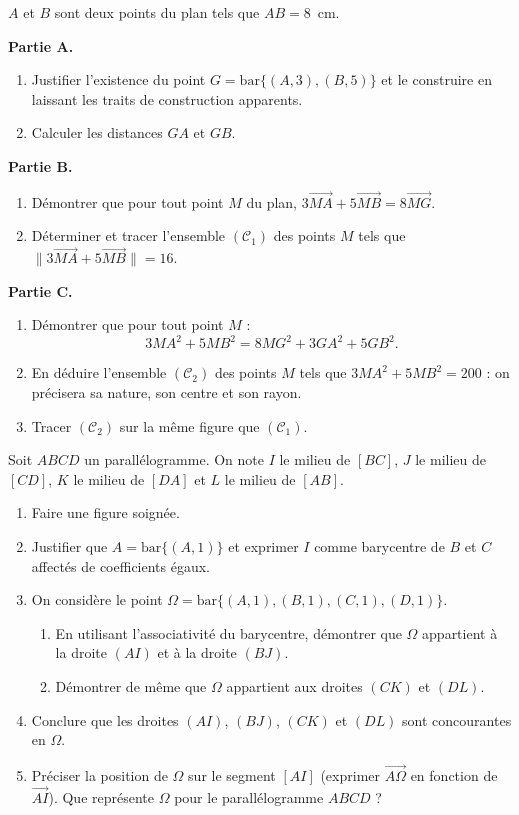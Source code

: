 \documentclass[11pt]{article}
\begin{document}
\begin{exercice}
$A$ et $B$ sont deux points du plan tels que $AB=8$~cm.

\textbf{Partie A.}
\begin{enumerate}
\item Justifier l'existence du point $G=\mathrm{bar}\{(A,3),(B,5)\}$ et le construire en laissant les traits de construction apparents.
\item Calculer les distances $GA$ et $GB$.
\end{enumerate}

\textbf{Partie B.}
\begin{enumerate}
\item Démontrer que pour tout point $M$ du plan, $3\overrightarrow{MA}+5\overrightarrow{MB}=8\overrightarrow{MG}$.
\item Déterminer et tracer l'ensemble $(\mathcal{C}_{1})$ des points $M$ tels que $\|3\overrightarrow{MA}+5\overrightarrow{MB}\|=16$.
\end{enumerate}

\textbf{Partie C.}
\begin{enumerate}
\item Démontrer que pour tout point $M$ :
\[ 3MA^{2}+5MB^{2}=8MG^{2}+3GA^{2}+5GB^{2}. \]
\item En déduire l'ensemble $(\mathcal{C}_{2})$ des points $M$ tels que $3MA^{2}+5MB^{2}=200$ : on précisera sa nature, son centre et son rayon.
\item Tracer $(\mathcal{C}_{2})$ sur la même figure que $(\mathcal{C}_{1})$.
\end{enumerate}
\end{exercice}

\begin{exercice}
Soit $ABCD$ un parallélogramme. On note $I$ le milieu de $[BC]$, $J$ le milieu de $[CD]$, $K$ le milieu de $[DA]$ et $L$ le milieu de $[AB]$.
\begin{enumerate}
\item Faire une figure soignée.
\item Justifier que $A=\mathrm{bar}\{(A,1)\}$ et exprimer $I$ comme barycentre de $B$ et $C$ affectés de coefficients égaux.
\item On considère le point $\Omega=\mathrm{bar}\{(A,1),(B,1),(C,1),(D,1)\}$.
\begin{enumerate}
\item En utilisant l'associativité du barycentre, démontrer que $\Omega$ appartient à la droite $(AI)$ et à la droite $(BJ)$.
\item Démontrer de même que $\Omega$ appartient aux droites $(CK)$ et $(DL)$.
\end{enumerate}
\item Conclure que les droites $(AI)$, $(BJ)$, $(CK)$ et $(DL)$ sont concourantes en $\Omega$.
\item Préciser la position de $\Omega$ sur le segment $[AI]$ (exprimer $\overrightarrow{A\Omega}$ en fonction de $\overrightarrow{AI}$). Que représente $\Omega$ pour le parallélogramme $ABCD$ ?
\end{enumerate}
\end{exercice}
\end{document}
